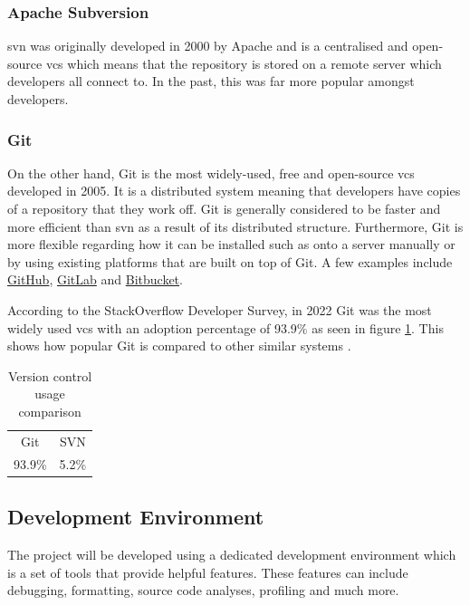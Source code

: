 \documentclass[11pt]{article}
\begin{document}
\subsubsection{Apache Subversion}
\gls*{svn} was originally developed in 2000 by Apache and is a centralised and
open-source \gls*{vcs} which means that the repository is stored on a remote
server which developers all connect to. In the past, this was far more popular
amongst developers.

\subsubsection{Git}
On the other hand, Git is the most widely-used, free and open-source \gls*{vcs}
developed in 2005. It is a distributed system meaning that developers have
copies of a repository that they work off. Git is generally considered to be
faster and more efficient than \gls*{svn} as a result of its distributed
structure. Furthermore, Git is more flexible regarding how it can be installed
such as onto a server manually or by using existing platforms that are built on
top of Git. A few examples include \href{http://github.com}{GitHub},
\href{http://gitlab.com}{GitLab} and \href{https://bitbucket.org/}{Bitbucket}. 

According to the StackOverflow Developer Survey, in 2022 Git was the most widely
used \gls*{vcs} with an adoption percentage of 93.9\% as seen in figure
\ref{tab:vcs_comparison}. This shows how popular Git is compared to other
similar systems \cite{vcs_survey}.

\begin{table}[H]
\begin{center}
  \begin{tabular}{cc}
    
    \rowcolor{gray!50}
    Git & SVN \\
    93.9\% & 5.2\% \\
  \end{tabular}
\end{center}
\caption{Version control usage comparison}
\label{tab:vcs_comparison}
\end{table}



\subsection{Development Environment}

The project will be developed using a dedicated development environment which is
a set of tools that provide helpful features. These features can include
debugging, formatting, source code analyses, profiling and much more.
\end{document}
